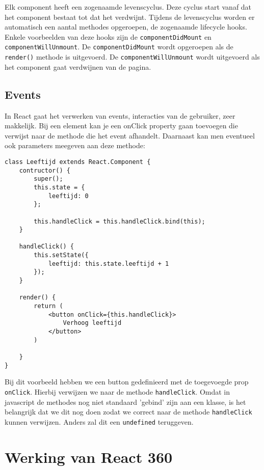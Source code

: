 Elk component heeft een zogenaamde levenscyclus. Deze cyclus start vanaf dat het component bestaat tot dat het verdwijnt. Tijdens de levenscyclus worden er automatisch een aantal methodes opgeroepen, de zogenaamde lifecycle hooks. Enkele voorbeelden van deze hooks zijn de \lstinline[basicstyle=\ttfamily\color{red}]|componentDidMount| en \lstinline[basicstyle=\ttfamily\color{red}]|componentWillUnmount|. De \lstinline[basicstyle=\ttfamily\color{red}]|componentDidMount| wordt opgeroepen als de \lstinline[basicstyle=\ttfamily\color{red}]|render()| methode is uitgevoerd. De \lstinline[basicstyle=\ttfamily\color{red}]|componentWillUnmount| wordt uitgevoerd als het component gaat verdwijnen van de pagina.

\subsection{Events}
\label{subsec:events}
In React gaat het verwerken van events, interacties van de gebruiker, zeer makkelijk. Bij een element kan je een onClick property gaan toevoegen die verwijst naar de methode die het event afhandelt. Daarnaast kan men eventueel ook parameters meegeven aan deze methode:

\begin{lstlisting}[frame=single, caption=Een event afhandelen]
class Leeftijd extends React.Component {
	contructor() {
		super();
		this.state = {
			leeftijd: 0
		};
		
		this.handleClick = this.handleClick.bind(this);
	}
	
	handleClick() {
		this.setState({
			leeftijd: this.state.leeftijd + 1
		});
	}

	render() {
		return (
			<button onClick={this.handleClick}>
				Verhoog leeftijd
			</button>
		)

	}
}
\end{lstlisting}

Bij dit voorbeeld hebben we een button gedefinieerd met de toegevoegde prop \lstinline[basicstyle=\ttfamily\color{red}]|onClick|. Hierbij verwijzen we naar de methode \lstinline[basicstyle=\ttfamily\color{red}]|handleClick|. Omdat in javascript de methodes nog niet standaard 'gebind' zijn aan een klasse, is het belangrijk dat we dit nog doen zodat we correct naar de methode \lstinline[basicstyle=\ttfamily\color{red}]|handleClick| kunnen verwijzen. Anders zal dit een \lstinline[basicstyle=\ttfamily\color{red}]|undefined| teruggeven.

\section{Werking van React 360}
\label{sec:werking-react360}

